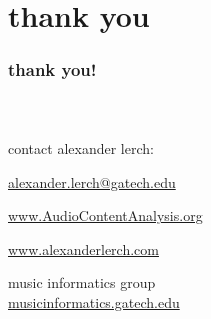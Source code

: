    \section[contact]{thank you}

      \begin{frame}\frametitle{thank you!}\framesubtitle{~}
           \bigskip
            \begin{block}{contact}
                alexander lerch:
                
                \href{mailto:alexander.lerch@gatech.edu}{alexander.lerch@gatech.edu}
                
                \bigskip                
                \href{https://www.AudioContentAnalysis.org}{www.AudioContentAnalysis.org}
                
                \href{http://www.alexanderlerch.com}{www.alexanderlerch.com}

                \bigskip
                music informatics group\\
                \href{http://musicinformatics.gatech.edu}{musicinformatics.gatech.edu}
            \end{block}
        \end{frame}
